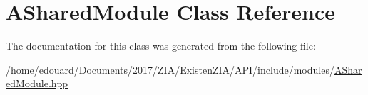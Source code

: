 \hypertarget{classASharedModule}{}\section{A\+Shared\+Module Class Reference}
\label{classASharedModule}


The documentation for this class was generated from the following file\+:\begin{DoxyCompactItemize}
\item 
/home/edouard/\+Documents/2017/\+Z\+I\+A/\+Existen\+Z\+I\+A/\+A\+P\+I/include/modules/\mbox{\hyperlink{ASharedModule_8hpp}{A\+Shared\+Module.\+hpp}}\end{DoxyCompactItemize}
